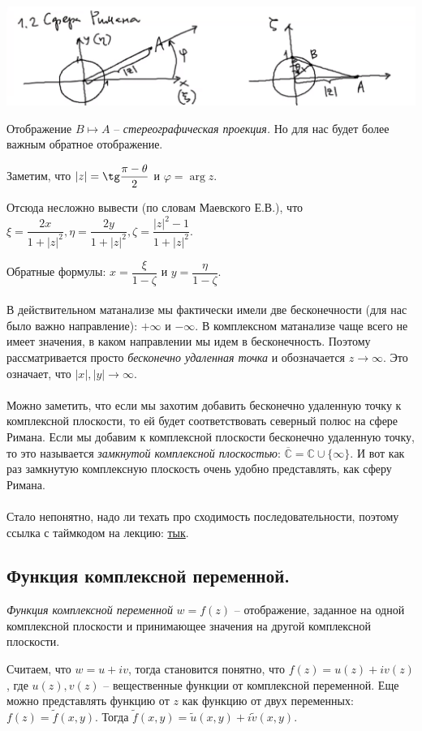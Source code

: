 \includegraphics[scale=0.7]{img/3.png}
 
 \begin{definition*}
Отображение $B \longmapsto A$ -- \textit{стереографическая проекция.} Но для нас будет более важным обратное отображение. 
 \end{definition*}

Заметим, что $|z| = \tg \dfrac{\pi - \theta}{2} $ и $\varphi = \operatorname{arg} z$.

 Отсюда несложно вывести (по словам Маевского Е.В.), что $\xi = \dfrac{2x}{1 + |z|^2}, \eta = \dfrac{2y}{1 + |z|^2}, \zeta = \dfrac{|z|^2 - 1}{1 + |z|^2}$.  
 
 Обратные формулы: $x = \dfrac{\xi}{1 - \zeta}$ и $y = \dfrac{\eta}{1 - \zeta}$.
 \\
 \\
В действительном матанализе мы фактически имели две бесконечности (для нас было важно направление): $+\infty $ и $-\infty $. В комплексном матанализе чаще всего не имеет значения, в каком направлении мы идем в бесконечность. Поэтому рассматривается просто \textit{бесконечно удаленная точка }и обозначается $z \to \infty$. Это означает, что $|x|, |y| \to \infty$.  
\\
\\
Можно заметить, что если мы захотим добавить бесконечно удаленную точку к комплексной плоскости, то ей будет соответствовать северный полюс на сфере Римана.  Если мы добавим к комплексной плоскости бесконечно удаленную точку, то  это называется \textit{замкнутой комплексной плоскостью}: $\overline{\mathbb{C}}= \mathbb{C} \cup \{ \infty \}$.  И вот как раз замкнутую комплексную плоскость очень удобно представлять, как сферу Римана.
\\
\\
Стало непонятно, надо ли техать про  сходимость последовательности, поэтому ссылка с таймкодом на лекцию: \href{https://youtu.be/lUqrd4aP3Zc?t=1777}{тык}.
  
  
\subsection*{Функция комплексной переменной.}
\begin{definition*}
\textit{Функция комплексной переменной }$w = f(z)$ -- отображение, заданное на одной комплексной плоскости и принимающее значения на другой комплексной плоскости. 
\end{definition*}
Считаем, что $w = u + iv$, тогда становится понятно, что $f(z) = u(z) + iv(z)$, где $u(z), v(z) $ -- вещественные функции от комплексной переменной. Еще можно представлять функцию от $z$ как функцию от двух переменных: $f(z) = \widetilde{f}(x, y)$.  Тогда $\widetilde{f}(x, y) = \widetilde{u}(x, y) + i \widetilde{v}(x, y)$.

